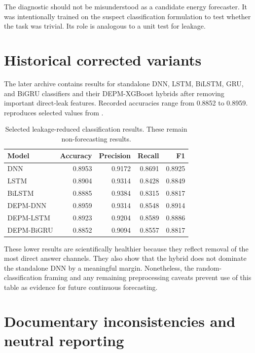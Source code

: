 The diagnostic should not be misunderstood as a candidate energy forecaster. It was intentionally trained on the suspect classification formulation to test whether the task was trivial. Its role is analogous to a unit test for leakage.

\section{Historical corrected variants}

The later archive contains results for standalone DNN, LSTM, BiLSTM, GRU, and BiGRU classifiers and their DEPM-XGBoost hybrids after removing important direct-leak features. Recorded accuracies range from 0.8852 to 0.8959.  reproduces selected values from .

\begin{table}[H]
\centering
\caption[Selected leakage-reduced classification results]{Selected leakage-reduced classification results. These remain non-forecasting results.}
\label{tab:depmvariants}
\begin{tabular}{lrrrr}
\toprule
Model & Accuracy & Precision & Recall & F1 \\
\midrule
DNN & 0.8953 & 0.9172 & 0.8691 & 0.8925 \\
LSTM & 0.8904 & 0.9314 & 0.8428 & 0.8849 \\
BiLSTM & 0.8885 & 0.9384 & 0.8315 & 0.8817 \\
DEPM-DNN & 0.8959 & 0.9314 & 0.8548 & 0.8914 \\
DEPM-LSTM & 0.8923 & 0.9204 & 0.8589 & 0.8886 \\
DEPM-BiGRU & 0.8852 & 0.9094 & 0.8557 & 0.8817 \\
\bottomrule
\end{tabular}
\end{table}

These lower results are scientifically healthier because they reflect removal of the most direct answer channels. They also show that the hybrid does not dominate the standalone DNN by a meaningful margin. Nonetheless, the random-classification framing and any remaining preprocessing caveats prevent use of this table as evidence for future continuous forecasting.

\section{Documentary inconsistencies and neutral reporting}

